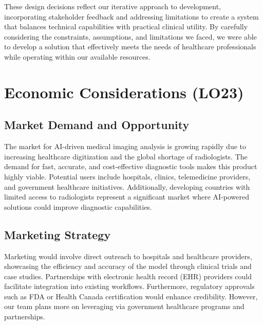 \documentclass{article}
\begin{document}
\noindent These design decisions reflect our iterative approach to development, incorporating stakeholder feedback and addressing limitations to create a system that balances technical capabilities with practical clinical utility. By carefully considering the constraints, assumptions, and limitations we faced, we were able to develop a solution that effectively meets the needs of healthcare professionals while operating within our available resources.

\section{Economic Considerations (LO23)}

\subsection{Market Demand and Opportunity}
The market for AI-driven medical imaging analysis is growing rapidly due to increasing healthcare digitization and the global shortage of radiologists. The demand for fast, accurate, and cost-effective diagnostic tools makes this product highly viable. Potential users include hospitals, clinics, telemedicine providers, and government healthcare initiatives. Additionally, developing countries with limited access to radiologists represent a significant market where AI-powered solutions could improve diagnostic capabilities.

\subsection{Marketing Strategy}
Marketing would involve direct outreach to hospitals and healthcare providers, showcasing the efficiency and accuracy of the model through clinical trials and case studies. Partnerships with electronic health record (EHR) providers could facilitate integration into existing workflows. Furthermore, regulatory approvals such as FDA or Health Canada certification would enhance credibility. However, our team plans more on leveraging via government healthcare programs and partnerships.
\end{document}
